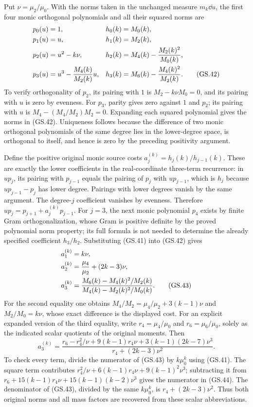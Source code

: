 Put $\nu=\mu_2/\mu_0$. With the norms taken in the unchanged
measure $m_k\dd u$, the first four monic orthogonal polynomials
and all their squared norms are
\begin{align}
 p_0(u)&=1,&h_0(k)&=M_0(k),\notag\\
 p_1(u)&=u,&h_1(k)&=M_2(k),\notag\\
 p_2(u)&=u^2-k\nu,&h_2(k)&=M_4(k)-\frac{M_2(k)^2}{M_0(k)},\notag\\
 p_3(u)&=u^3-\frac{M_4(k)}{M_2(k)}u,
 &h_3(k)&=M_6(k)-\frac{M_4(k)^2}{M_2(k)}.
 \tag{GS.42}
\end{align}
To verify orthogonality of $p_2$, its pairing with $1$ is
$M_2-k\nu M_0=0$, and its pairing with $u$ is zero by evenness.
For $p_3$, parity gives zero against $1$ and $p_2$; its pairing
with $u$ is $M_4-(M_4/M_2)M_2=0$. Expanding each squared
polynomial gives the norms in (GS.42). Uniqueness follows because
the difference of two monic orthogonal polynomials of the same
degree lies in the lower-degree space, is orthogonal to itself,
and hence is zero by the preceding positivity argument.

Define the positive original monic source costs $a_j^{(k)}=h_j(k)/h_{j-1}(k)$.
These are exactly the lower coefficients in the real-coordinate
three-term recurrence: in $u p_j$, its pairing with $p_{j-1}$
equals the pairing of $p_j$ with $u p_{j-1}$, which is $h_j$
because $u p_{j-1}-p_j$ has lower degree. Pairings with lower
degrees vanish by the same argument. The degree-$j$ coefficient
vanishes by evenness. Therefore $u p_j=p_{j+1}+a_j^{(k)}p_{j-1}$.
For $j=3$, the next monic polynomial $p_4$ exists by finite
Gram orthogonalization, whose Gram is positive definite by the
proved polynomial norm property; its full formula is not needed
to determine the already specified coefficient $h_3/h_2$.
Substituting (GS.41) into (GS.42) gives
\begin{align}
 a_1^{(k)}&=k\nu,\notag\\
 a_2^{(k)}&=\frac{\mu_4}{\mu_2}+(2k-3)\nu,\notag\\
 a_3^{(k)}&=
 \frac{M_6(k)-M_4(k)^2/M_2(k)}
      {M_4(k)-M_2(k)^2/M_0(k)}.\tag{GS.43}
\end{align}
For the second equality one obtains
$M_4/M_2=\mu_4/\mu_2+3(k-1)\nu$ and
$M_2/M_0=k\nu$, whose exact difference is the displayed cost.
For an explicit expanded version of the third equality, write
$r_4=\mu_4/\mu_0$ and $r_6=\mu_6/\mu_0$, solely as the
indicated scalar quotients of the original moments. Then
\begin{equation}
 a_3^{(k)}=
 \frac{r_6-r_4^2/\nu+9(k-1)r_4\nu
                  +3(k-1)(2k-7)\nu^3}
      {r_4+(2k-3)\nu^2}.\tag{GS.44}
\end{equation}
To check every term, divide the numerator of (GS.43) by
$k\mu_0^k$ using (GS.41). The square term contributes
$r_4^2/\nu+6(k-1)r_4\nu+9(k-1)^2\nu^3$; subtracting it
from $r_6+15(k-1)r_4\nu+15(k-1)(k-2)\nu^3$ gives
the numerator in (GS.44). The denominator of (GS.43), divided
by the same $k\mu_0^k$, is $r_4+(2k-3)\nu^2$.
Thus both original norms and all mass factors are recovered from
these scalar abbreviations.

